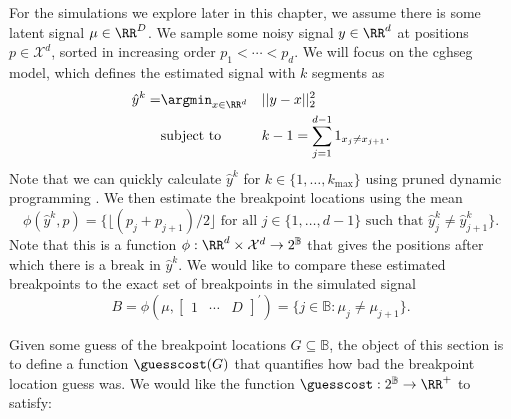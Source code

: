 \documentclass{article}
\begin{document}
For the simulations we explore later in this chapter, we assume there
is some latent signal $\mu\in\RR^D$. We sample some noisy signal
$y\in\RR^{d}$ at positions $p\in\mathcal X^{d}$, sorted in increasing
order $p_1<\cdots<p_d$. We will focus on the cghseg model, which
defines the estimated signal with $k$ segments as
\begin{equation}
\label{eq:yhat^k}
\begin{aligned}
\hat y^k = &\argmin_{x\in\RR^d} &&  ||y - x||^2_2
\\
&\text{subject to} && k-1=\sum_{j=1}^{d-1} 1_{x_j\neq x_{j+1}}.
\end{aligned}
\end{equation}
Note that we can quickly calculate $\hat y^k$ for
$k\in\{1,\dots,k_{\text{max}}\}$ using pruned dynamic programming
\citep{pruned-dp}. We then estimate the breakpoint locations using the mean
\begin{equation}
  \label{eq:breaks}
\phi(\hat y^k,p)
= \big\{
\lfloor 
(p_j+p_{j+1})/2
\rfloor
\text{ for all }j\in\{1,\dots,d-1\}\text{ such that }
\hat y^k_j\neq \hat y^k_{j+1}
\big\}.
\end{equation}
Note that this is a function $\phi:\RR^d\times \mathcal X^d\rightarrow
2^{\mathbb B}$ that gives the positions after which there is a break
in $\hat y^k$. We would like to compare these estimated breakpoints to
the exact set of breakpoints in the simulated signal
\begin{equation}
  \label{eq:breaks}
  B = \phi\left(\mu,
\left[
  \begin{array}{ccc}
    1 & \cdots & D
  \end{array}
\right]^\prime
\right)
=
\{j\in\mathbb B:\mu_j\neq\mu_{j+1}\}.
\end{equation}


\newpage

Given some guess of the breakpoint locations $G\subseteq\mathbb B$,
the object of this section is to define a function ${\guesscost}(G)$
that quantifies how bad the breakpoint location guess was. We would
like the function ${\guesscost}: 2^{\mathbb B}\rightarrow \RR^+$ to
satisfy:
\end{document}
